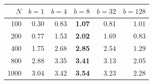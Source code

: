 \begin{tabular}{@{}r r r r r r@{}}
\toprule
$N$ & $b=1$ & $b=4$ & $b=8$ & $b=32$ & $b=128$ \\
\midrule
100 & 0.30 & 0.83 & \textbf{1.07} & 0.81 & 1.01 \\
200 & 0.77 & 1.53 & \textbf{2.02} & 1.69 & 0.83 \\
400 & 1.75 & 2.68 & \textbf{2.85} & 2.54 & 1.29 \\
800 & 2.88 & 3.35 & \textbf{3.41} & 3.13 & 2.05 \\
1000 & 3.04 & 3.42 & \textbf{3.54} & 3.23 & 2.28 \\
\bottomrule
\end{tabular}
